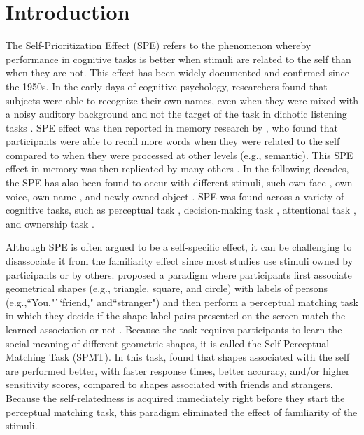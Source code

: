 \documentclass[sn-apa]{sn-jnl}%
\theoremstyle{thmstyleone}%
\theoremstyle{thmstyletwo}%
\theoremstyle{thmstylethree}%
\begin{document}

\maketitle

\section{Introduction}\label{sec:intro}

The Self-Prioritization Effect (SPE) refers to the phenomenon whereby performance in cognitive tasks is better when stimuli are related to the self than when they are not. This effect has been widely documented and confirmed since the 1950s. In the early days of cognitive psychology, researchers found that subjects were able to recognize their own names, even when they were mixed with a noisy auditory background and not the target of the task in dichotic listening tasks \parencite{cherry1953some,moray1959attention}. SPE effect was then reported in memory research by \textcite{craik1975depth}, who found that participants were able to recall more words when they were related to the self compared to when they were processed at other levels (e.g., semantic). This SPE effect in memory was then replicated by many others \parencite{conway1995the,rogers1977self,symons1997the}. In the following decades, the SPE has also been found to occur with different stimuli, such own face \parencite{keenan2000self,kircher2000towards,turk2002mike}, own voice\parencite{hughes2013i,payne2021perceptual}, own name \parencite{constable2019it}, and newly owned object \parencite{strachan2020it}. SPE was found across a variety of cognitive tasks, such as perceptual task \parencite{cunningham2017editorial, desebrock2018self}, decision-making task \parencite{sui2013self}, attentional task \parencite{shapiro1997personal}, and ownership task \parencite{cunningham2008yours}.

Although SPE is often argued to be a self-specific effect, it can be challenging to disassociate it from the familiarity effect since most studies use stimuli owned by participants or by others. \textcite{sui2012perceptual} proposed a paradigm where participants first associate geometrical shapes (e.g., triangle, square, and circle) with labels of persons (e.g.,``You,"``friend," and``stranger") and then perform a perceptual matching task in which they decide if the shape-label pairs presented on the screen match the learned association or not \parencite{sui2012perceptual}. Because the task requires participants to learn the social meaning of different geometric shapes, it is called the Self-Perceptual Matching Task (SPMT). In this task, \textcite{sui2012perceptual} found that shapes associated with the self are performed better, with faster response times, better accuracy, and/or higher sensitivity scores, compared to shapes associated with friends and strangers. Because the self-relatedness is acquired immediately right before they start the perceptual matching task, this paradigm eliminated the effect of familiarity of the stimuli. 
\end{document}

